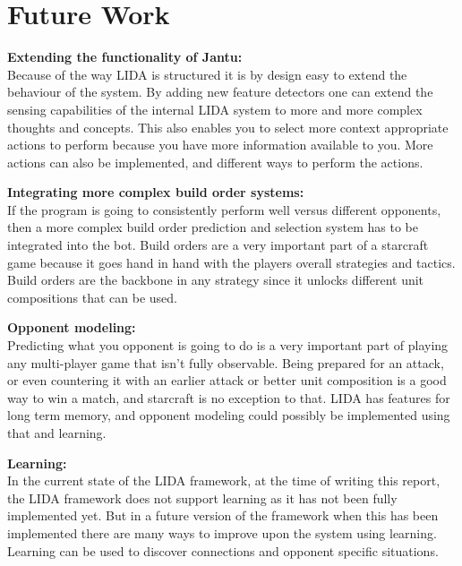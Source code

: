 
\chapter{Future Work}

\textbf{Extending the functionality of Jantu:} \\
Because of the way LIDA is structured it is by design easy to extend the behaviour of the system. By adding new feature detectors one can extend the sensing capabilities of the internal LIDA system to more and more complex thoughts and concepts. This also enables you to select more context appropriate actions to perform because you have more information available to you. More actions can also be implemented, and different ways to perform the actions. 

\textbf{Integrating more complex build order systems:} \\
If the program is going to consistently perform well versus different opponents, then a more complex build order prediction and selection system has to be integrated into the bot. Build orders are a very important part of a starcraft game because it goes hand in hand with the players overall strategies and tactics. Build orders are the backbone in any strategy since it unlocks different unit compositions that can be used. 

\textbf{Opponent modeling:} \\
Predicting what you opponent is going to do is a very important part of playing any multi-player game that isn't fully observable. Being prepared for an attack, or even countering it with an earlier attack or better unit composition is a good way to win a match, and starcraft is no exception to that. LIDA has features for long term memory, and opponent modeling could possibly be implemented using that and learning.

\textbf{Learning:} \\
In the current state of the LIDA framework, at the time of writing this report, the LIDA framework does not support learning as it has not been fully implemented yet. But in a future version of the framework when this has been implemented there are many ways to improve upon the system using learning. Learning can be used to discover connections and opponent specific situations. 